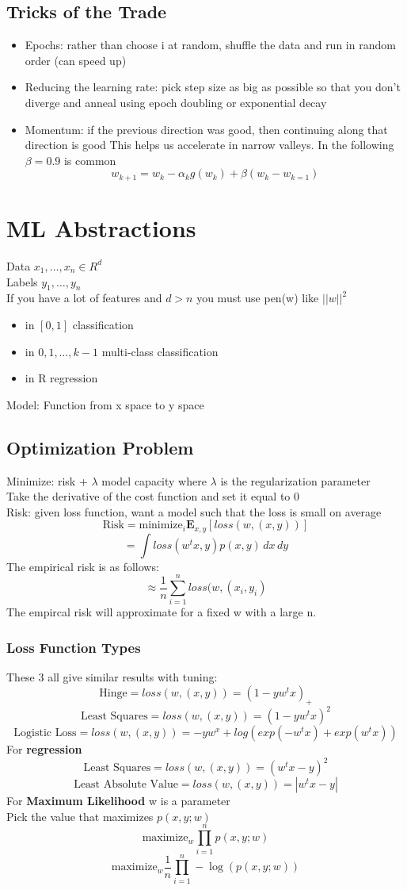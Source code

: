 \documentclass{article}
\begin{document}
\subsection{Tricks of the Trade}
\begin{itemize}
\item Epochs: rather than choose i at random, shuffle the data and run in random order (can speed up)
\item Reducing the learning rate: pick step size as big as possible so that you don’t diverge and anneal using epoch doubling or exponential decay
\item Momentum: if the previous direction was good, then continuing along that direction is good This helps us accelerate in narrow valleys. In the following $\beta = 0.9$ is common
$$w_{k+1} = w_k - \alpha_k g(w_k) + \beta (w_k - w_{k=1})$$
\end{itemize}

\section{ML Abstractions}
Data $x_1,…,x_n \in R^d$ \\
Labels $y_1,…,y_n$ \\ 
If you have a lot of features and $d>n$ you must use pen(w) like $||w||^2$
\begin{itemize}
\item in $[0,1]$ classification
\item in ${0,1,…,k-1}$ multi-class classification
\item in R regression
\end{itemize}
Model: Function from x space to y space \\ 
\subsection{Optimization Problem}
Minimize: risk + $\lambda$ model capacity where $\lambda$ is the regularization parameter \\
Take the derivative of the cost function and set it equal to 0 \\
Risk: given loss function, want a model such that the loss is small on average
$$\textrm{Risk} = \textrm{minimize}_i \mathbf{E}_{x,y}[loss(w,(x,y))]$$
$$= \int loss(w^tx,y) p(x,y) \, dx \, dy$$
The empirical risk is as follows:
$$ \approx \frac{1}{n} \sum_{i=1}^n loss(w, (x_i,y_i) $$
The empircal risk will approximate for a fixed w with a large n.
\subsubsection{Loss Function Types}
These 3 all give similar results with tuning:
$$\textrm{Hinge} = loss(w,(x,y)) = (1-yw^tx)_+$$
$$\textrm{Least Squares} = loss(w,(x,y)) = (1-yw^tx)^2$$
$$\textrm{Logistic Loss} = loss(w,(x,y)) = -yw^x + log(exp(-w^tx) + exp(w^tx))$$
For \textbf{regression}
$$\textrm{Least Squares} = loss(w,(x,y)) = (w^tx - y)^2$$
$$\textrm{Least Absolute Value} = loss(w,(x,y)) = |w^tx - y|$$
For \textbf{Maximum Likelihood}
w is a parameter\\
Pick the value that maximizes $p(x,y;w)$
$$\textrm{maximize}_w \prod_{i=1}^n p(x,y;w)$$
$$\textrm{maximize}_w \frac{1}{n} \prod_{i=1}^n -\log(p(x,y;w))$$
\end{document}
